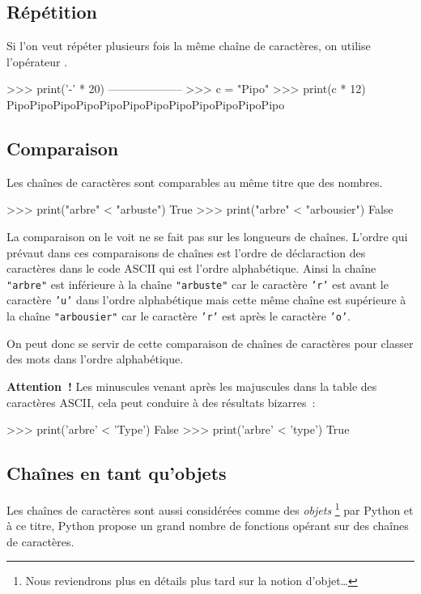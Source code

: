 \subsection{Répétition}
Si l'on veut répéter plusieurs fois la même chaîne de caractères, on utilise l'opérateur \motcle{*}.
\begin{pythoncode}
>>> print('-' * 20)
--------------------
>>> c = "Pipo"
>>> print(c * 12)
PipoPipoPipoPipoPipoPipoPipoPipoPipoPipoPipoPipo
\end{pythoncode}

\subsection{Comparaison}
Les chaînes de caractères sont comparables au même titre que des nombres.

\begin{pythoncode}
>>> print("arbre" < "arbuste")
True
>>> print("arbre" < "arbousier")
False
\end{pythoncode}

La comparaison on le voit ne se fait pas sur les longueurs de chaînes. L'ordre qui prévaut dans ces comparaisons de chaînes est l'ordre de déclaraction des caractères dans le code ASCII qui est l'ordre alphabétique. Ainsi la chaîne \texttt{"arbre"} est inférieure à la chaîne \texttt{"arbuste"} car le caractère \texttt{'r'} est avant le caractère \texttt{'u'} dans l'ordre alphabétique mais cette même chaîne est supérieure à la chaîne \texttt{"arbousier"} car le caractère \texttt{'r'} est après le caractère \texttt{'o'}.

On peut donc se servir de cette comparaison de chaînes de caractères pour classer des mots dans l'ordre alphabétique.

\begin{remarque}
\textbf{Attention~!} Les minuscules venant après les majuscules dans la table des caractères ASCII, cela peut conduire à des résultats bizarres~:
\begin{pythoncode}
>>> print('arbre' < 'Type')
False
>>> print('arbre' < 'type')
True
\end{pythoncode}
\end{remarque}

\subsection{Chaînes en tant qu'objets}
Les chaînes de caractères sont aussi considérées comme des \textit{objets}
\footnote{Nous reviendrons plus en détails plus tard sur la notion d'objet\dots} par Python
et à ce titre, Python propose un grand nombre de fonctions opérant sur des chaînes de caractères.

